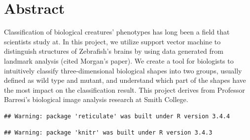 \documentclass[10pt,letterpaper]{article}
\date{}
\newcommand{\getIndex}[2]{
  \ForEach{,}{\IfEq{#1}{\thislevelitem}{\number\thislevelcount\ExitForEach}{}}{#2}
}
\newcommand{\getAff}[1]{
  \getIndex{#1}{Smith College}
}
\begin{document}
\vspace*{0.2in}

\section*{Abstract}
Classification of biological creatures' phenotypes has long been a field
that scientists study at. In this project, we utilize support vector
machine to distinguish structures of Zebrafish's brains by using data
generated from landmark analysis (cited Morgan's paper). We create a
tool for biologists to intuitively classify three-dimensional biological
shapes into two groups, usually defined as wild type and mutant, and
understand which part of the shapes have the most impact on the
classification result. This project derives from Professor Barresi's
biological image analysis research at Smith College.


\linenumbers

\begin{verbatim}
## Warning: package 'reticulate' was built under R version 3.4.4
\end{verbatim}

\begin{verbatim}
## Warning: package 'knitr' was built under R version 3.4.3
\end{verbatim}
\end{document}

